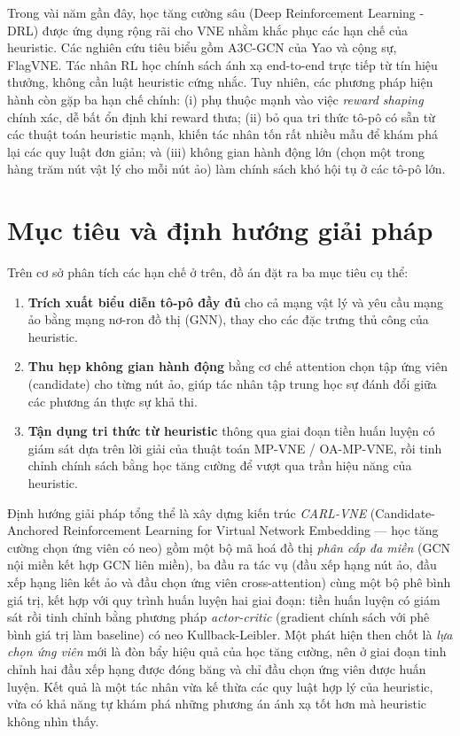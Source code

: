 \documentclass[../DoAn.tex]{subfiles}
\begin{document}
Trong vài năm gần đây, học tăng cường sâu (Deep Reinforcement Learning - DRL) được ứng dụng rộng rãi cho VNE nhằm khắc phục các hạn chế của heuristic. Các nghiên cứu tiêu biểu gồm A3C-GCN của Yao và cộng sự\cite{yao2018a3c_gcn}, FlagVNE\cite{flagvne2024}. Tác nhân RL học chính sách ánh xạ end-to-end trực tiếp từ tín hiệu thưởng, không cần luật heuristic cứng nhắc. Tuy nhiên, các phương pháp hiện hành còn gặp ba hạn chế chính: (i) phụ thuộc mạnh vào việc \textit{reward shaping} chính xác, dễ bất ổn định khi reward thưa; (ii) bỏ qua tri thức tô-pô có sẵn từ các thuật toán heuristic mạnh, khiến tác nhân tốn rất nhiều mẫu để khám phá lại các quy luật đơn giản; và (iii) không gian hành động lớn (chọn một trong hàng trăm nút vật lý cho mỗi nút ảo) làm chính sách khó hội tụ ở các tô-pô lớn.

\section{Mục tiêu và định hướng giải pháp}

Trên cơ sở phân tích các hạn chế ở trên, đồ án đặt ra ba mục tiêu cụ thể:

\begin{enumerate}
\item \textbf{Trích xuất biểu diễn tô-pô đầy đủ} cho cả mạng vật lý và yêu cầu mạng ảo bằng mạng nơ-ron đồ thị (GNN), thay cho các đặc trưng thủ công của heuristic.
\item \textbf{Thu hẹp không gian hành động} bằng cơ chế attention chọn tập ứng viên (candidate) cho từng nút ảo, giúp tác nhân tập trung học sự đánh đổi giữa các phương án thực sự khả thi.
\item \textbf{Tận dụng tri thức từ heuristic} thông qua giai đoạn tiền huấn luyện có giám sát dựa trên lời giải của thuật toán MP-VNE / OA-MP-VNE, rồi tinh chỉnh chính sách bằng học tăng cường để vượt qua trần hiệu năng của heuristic.
\end{enumerate}

Định hướng giải pháp tổng thể là xây dựng kiến trúc \textit{CARL-VNE} (Candidate-Anchored Reinforcement Learning for Virtual Network Embedding — học tăng cường chọn ứng viên có neo) gồm một bộ mã hoá đồ thị \textit{phân cấp đa miền} (GCN nội miền kết hợp GCN liên miền), ba đầu ra tác vụ (đầu xếp hạng nút ảo, đầu xếp hạng liên kết ảo và đầu chọn ứng viên cross-attention) cùng một bộ phê bình giá trị, kết hợp với quy trình huấn luyện hai giai đoạn: tiền huấn luyện có giám sát rồi tinh chỉnh bằng phương pháp \textit{actor-critic} (gradient chính sách với phê bình giá trị làm baseline) có neo Kullback-Leibler. Một phát hiện then chốt là \textit{lựa chọn ứng viên} mới là đòn bẩy hiệu quả của học tăng cường, nên ở giai đoạn tinh chỉnh hai đầu xếp hạng được đóng băng và chỉ đầu chọn ứng viên được huấn luyện. Kết quả là một tác nhân vừa kế thừa các quy luật hợp lý của heuristic, vừa có khả năng tự khám phá những phương án ánh xạ tốt hơn mà heuristic không nhìn thấy.
\end{document}
